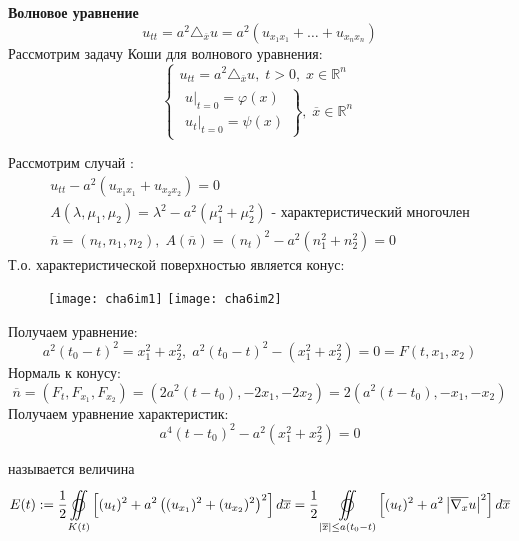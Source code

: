 \textbf{Волновое уравнение}
$$u_{tt} = a^2 \triangle_{\overline{x}} u = a^2 (u_{x_1 x_1} + \dots + u_{x_n x_n})$$
Рассмотрим задачу Коши для волнового уравнения:
$$\begin{cases}
	u_{tt} = a^2 \triangle_{\overline{x}} u, \; t > 0, \; x \in \mathbb{R}^n \\
	\left.
  		\begin{array}{ccc}
    		u|_{t=0} = \varphi(x) \\
    		u_t |_{t=0} = \psi (x)
  		\end{array}
	\right\}, \; \overline{x} \in \mathbb{R}^n
\end{cases}$$

Рассмотрим случай : 
$$\begin{gathered}
	u_{tt} - a^2 (u_{x_1 x_1} + u_{x_2 x_2}) = 0 \\
	A(\lambda, \mu_1, \mu_2) = \lambda^2 - a^2 (\mu_1^2 + \mu_2^2) \text{ - характеристический многочлен} \\
	\overline{n} = (n_t, n_1, n_2), \; A(\overline{n}) = (n_t)^2 - a^2 (n_1^2 + n_2^2) = 0
\end{gathered}$$
Т.о. характеристической поверхностью является конус:
\begin{figure}[h]
	\begin{multicols}{2}
		\texttt{[image: cha6im1]}
		\columnbreak
		\texttt{[image: cha6im2]}
	\end{multicols}
\end{figure} 

Получаем уравнение:
$$a^2 (t_0 -t)^2 = x_1^2 + x_2^2, \; a^2 (t_0 - t)^2 - (x_1^2 + x_2^2) = 0 = F(t, x_1, x_2)$$
Нормаль к конусу:
$$\overline{n} = (F_t, F_{x_1}, F_{x_2}) = (2a^2(t- t_0), -2x_1, -2x_2) = 2(a^2(t-t_0), -x_1, -x_2)$$
Получаем уравнение характеристик:
$$a^4 (t-t_0)^2 - a^2 (x_1^2 + x_2^2) = 0$$
\begin{definition}\label{lec:6/def:1}
	 называется величина
	$$E(t) := \frac{1}{2} \underset{K(t)}{\overset{}{\varoiint}}\left[ (u_t)^2 + a^2 \left( (u_{x_1})^2 + (u_{x_2})^2 \right)^2 \right] d \overline{x} = \frac{1}{2} \underset{|\overline{x}| \le a (t_0 - t)}{\overset{}{\varoiint}}\left[ (u_t)^2 + a^2 \left| \overline{\nabla_x} u \right|^2 \right] d \overline{x}$$
\end{definition}

